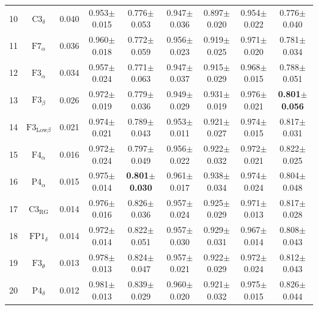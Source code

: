 \documentclass[pdflatex,sn-mathphys]{sn-jnl}%
\theoremstyle{thmstyleone}%
\theoremstyle{thmstyletwo}%
\theoremstyle{thmstylethree}%
\begin{document}
\begin{appendices}
\begin{table}[h!]
{\begin{tabular}{r|cccccccc}
  10 &          $\text{C3}_{\delta}$ &  0.040 &          0.953$\pm$0.015 &          0.776$\pm$0.053 &          0.947$\pm$0.036 &          0.897$\pm$0.020 &          0.954$\pm$0.022 &          0.776$\pm$0.040 \\
  11 &          $\text{F7}_{\alpha}$ &  0.036 &          0.960$\pm$0.018 &          0.772$\pm$0.059 &          0.956$\pm$0.023 &          0.919$\pm$0.025 &          0.971$\pm$0.020 &          0.781$\pm$0.034 \\
  12 &          $\text{F3}_{\alpha}$ &  0.034 &          0.957$\pm$0.024 &          0.771$\pm$0.063 &          0.947$\pm$0.037 &          0.915$\pm$0.029 &          0.968$\pm$0.015 &          0.788$\pm$0.051 \\
  13 &           $\text{F3}_{\beta}$ &  0.026 &          0.972$\pm$0.019 &          0.779$\pm$0.036 &          0.949$\pm$0.029 &          0.931$\pm$0.019 &          0.976$\pm$0.021 & \textbf{0.801$\pm$0.056} \\
  14 & $\text{F3}_{\text{Low}\beta}$ &  0.021 &          0.974$\pm$0.021 &          0.789$\pm$0.043 &          0.953$\pm$0.011 &          0.921$\pm$0.027 &          0.974$\pm$0.015 &          0.817$\pm$0.031 \\
  15 &          $\text{F4}_{\alpha}$ &  0.016 &          0.972$\pm$0.024 &          0.797$\pm$0.049 &          0.956$\pm$0.022 &          0.922$\pm$0.032 &          0.972$\pm$0.021 &          0.822$\pm$0.025 \\
  16 &          $\text{P4}_{\alpha}$ &  0.015 &          0.975$\pm$0.014 & \textbf{0.801$\pm$0.030} &          0.961$\pm$0.017 &          0.938$\pm$0.034 &          0.974$\pm$0.024 &          0.804$\pm$0.048 \\
  17 &       $\text{C3}_{\text{RG}}$ &  0.014 &          0.976$\pm$0.016 &          0.826$\pm$0.036 &          0.957$\pm$0.024 &          0.925$\pm$0.029 &          0.971$\pm$0.013 &          0.817$\pm$0.028 \\
  18 &         $\text{FP1}_{\delta}$ &  0.014 &          0.972$\pm$0.014 &          0.822$\pm$0.051 &          0.957$\pm$0.030 &          0.929$\pm$0.031 &          0.967$\pm$0.014 &          0.808$\pm$0.043 \\
  19 &          $\text{F3}_{\theta}$ &  0.013 &          0.978$\pm$0.013 &          0.824$\pm$0.047 &          0.957$\pm$0.021 &          0.922$\pm$0.029 &          0.972$\pm$0.024 &          0.812$\pm$0.043 \\
  20 &          $\text{P4}_{\delta}$ &  0.012 &          0.981$\pm$0.013 &          0.839$\pm$0.029 &          0.960$\pm$0.020 &          0.921$\pm$0.032 &          0.975$\pm$0.015 &          0.826$\pm$0.044 \\

\end{tabular}}
\end{table}
\end{appendices}
\end{document}
